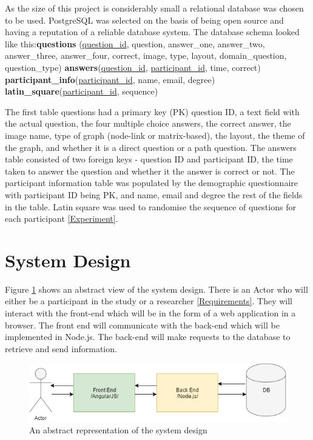 \documentclass{l4proj}
\begin{document}
As the size of this project is considerably small a relational database was chosen to be used. PostgreSQL was selected on the basis of being open source and having a reputation of a reliable database system. The database schema looked like this:\newline \textbf{questions} (\underline{question\_id}, question, answer\_one, answer\_two, answer\_three,
		answer\_four, correct, image, type, layout, domain\_question, question\_type) \newline
\textbf{answers}(\underline{question\_id}, \underline{participant\_id}, time, correct) \newline
\textbf{participant\_info}(\underline{participant\_id}, name, email, degree) \newline
\textbf{latin\_square}(\underline{participant\_id}, sequence) \newline

The first table questions had a primary key (PK) question ID, a text field with the actual question, the four multiple choice answers, the correct answer, the image name, type of graph (node-link or matrix-based), the layout, the theme of the graph, and whether it is a direct question or a path question. The answers table consisted of two foreign keys - question ID and participant ID, the time taken to answer the question and whether it the answer is correct or not. The participant information table was populated by the demographic questionnaire with participant ID being PK, and name, email and degree the rest of the fields in the table. Latin square was used to randomise the sequence of questions for each participant \ref{Experiment}.

\section{System Design}

Figure \ref{abstractDesign} shows an abstract view of the system design. There is an Actor who will either be a participant in the study or a researcher \ref{Requirements}. They will interact with the front-end which will be in the form of a web application in a browser. The front end will communicate with the back-end which will be implemented in Node.js. The back-end will make requests to the database to retrieve and send information. 

\begin{figure}[H]
\centering
\includegraphics[width=13cm]{abstractDesign.png}
\caption{An abstract representation of the system design}
\label{abstractDesign}
\end{figure}
\end{document}
